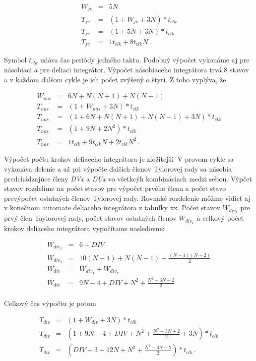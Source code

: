 \begin{eqnarray}
W_{jv} & = & 5N \nonumber \\ 
T_{jv} & = & (1 + W_{jv} + 3N)*t_{clk} \nonumber \\ 
T_{jv} & = & (1 + 5N + 3N)*t_{clk} \nonumber \\
T_{jv} & = & 1t_{clk} + 8t_{clk}N \, .
\end{eqnarray}

Symbol $ t_{clk} $ udáva čas periódy jedného taktu. Podobný výpočet vykonáme aj pre násobiaci a pre deliaci integrátor. 
Výpočet násobiaceho integrátora trvá 8 stavov a v každom ďalšom cykle je ich počet zvýšený o štyri. Z toho vyplýva, že

\begin{eqnarray}
W_{nas} & = & 6N + N(N+1) + N(N-1)  \nonumber \\
T_{nas} & = & (1 + W_{nas} + 3N)*t_{clk} \nonumber \\ 
T_{nas} & = & (1 + 6N + N(N+1) + N(N-1) + 3N)*t_{clk} \nonumber \\
T_{nas} & = & (1 + 9N + 2N^2)*t_{clk} \nonumber \\
T_{nas} & = & 1t_{clk} + 9t_{clk}N + 2t_{clk}N^2 \, .
\end{eqnarray}

Výpočet počtu krokov deliaceho integrátora je zložitejší. V provom cykle sa vykonáva delenie a až pri výpočte ďalších členov Tylorovej rady sa násobia predchádzajúce členy \textit{DVx} a \textit{DUx} vo všetkcýh kombináciach medzi sebou. Výpčet stavov rozdelíme na počet stavov pre výpočet prvého člena a počet stavo prevýpočet ostatných členov Tylorovej rady. Rovnaké rozdelenie môžme vidieť aj v konečnom automate deliaceho integrátora z tabuľky xx. Počet stavov $ W_{div_1} $ pre prvý člen Taylorovej rady, počet stavov ostatných členov $ W_{div_x} $ a celkový počet krokov deliaceho integrátora vypočítame nasledovne:

\begin{eqnarray}
W_{div_1} & = & 6 + DIV \nonumber \\ 
W_{div_x} & = & 10(N-1) + N(N-1) + \frac{(N-1)(N-2)}{2} \nonumber \\ 
W_{div} & = & W_{div_1} + W_{div_x} \nonumber \\ 
W_{div} & = & 9N - 4 + DIV + N^2 + \frac{N^2-3N+2}{2} \nonumber \\ 
\end{eqnarray}

Celkový čas výpočtu je potom  

\begin{eqnarray}
T_{div} & = & (1 + W_{div} + 3N)*t_{clk} \nonumber \\ 
T_{div} & = & (1 + 9N - 4 + DIV + N^2 + \frac{N^2-3N+2}{2} + 3N)*t_{clk} \nonumber \\
T_{div} & = & (DIV - 3 + 12N + N^2 + \frac{N^2-3N+2}{2})*t_{clk} \, .
\end{eqnarray}

